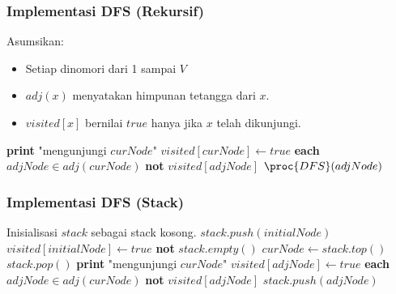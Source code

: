 \begin{frame}[fragile]
\frametitle{Implementasi DFS (Rekursif)}
%
Asumsikan:
\begin{itemize}
  \item Setiap \fnode dinomori dari 1 sampai $V$
  \item $adj(x)$ menyatakan himpunan tetangga dari \fnode $x$.
  \item $visited[x]$ bernilai $true$ hanya jika $x$ telah dikunjungi.
\end{itemize}
\begin{codebox}
  \li \textbf{print} "mengunjungi $curNode$"
  \li  $visited[curNode] \gets true$
  \li \For \textbf{each} $adjNode \in adj(curNode)$ \Do
  \li   \If \textbf{not} $visited[adjNode]$ \Then
  \li     $\proc{DFS}(adjNode)$
        \End
      \End
\end{codebox}
\end{frame}

\begin{frame}[fragile]
\frametitle{Implementasi DFS (Stack)}
%
%        
\begin{codebox}
  \li \Comment Inisialisasi $stack$ sebagai stack kosong.
  \li $stack.push(initialNode)$
  \li $visited[initialNode] \gets true$
  \li \While \textbf{not} $stack.empty()$ \Do
  \li   $curNode \gets stack.top()$
  \li   $stack.pop()$
  \li   \textbf{print} "mengunjungi $curNode$"
  \li    $visited[adjNode] \gets true$
  \li   \For \textbf{each} $adjNode \in adj(curNode)$ \Do
  \li     \If \textbf{not} $visited[adjNode]$ \Then
  \li       $stack.push(adjNode)$
          \End
        \End
      \End
\end{codebox}
\end{frame}

